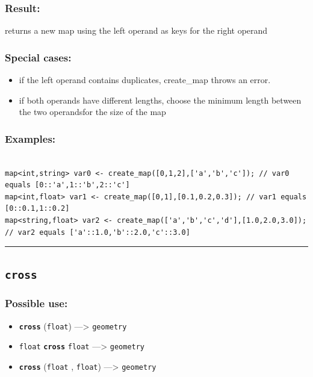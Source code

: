 \documentclass[]{book}
\providecommand{\tightlist}{%
  \setlength{\itemsep}{0pt}\setlength{\parskip}{0pt}}
\theoremstyle{definition}
\theoremstyle{definition}
\theoremstyle{definition}
\theoremstyle{remark}
\begin{document}
\subsubsection{Result:}\label{result-112}

returns a new map using the left operand as keys for the right operand

\subsubsection{Special cases:}\label{special-cases-43}

\begin{itemize}
\tightlist
\item
  if the left operand contains duplicates, create\_map throws an
  error.\\
\item
  if both operands have different lengths, choose the minimum length
  between the two operandsfor the size of the map
\end{itemize}

\subsubsection{Examples:}\label{examples-87}

\begin{verbatim}
 
map<int,string> var0 <- create_map([0,1,2],['a','b','c']); // var0 equals [0::'a',1::'b',2::'c'] 
map<int,float> var1 <- create_map([0,1],[0.1,0.2,0.3]); // var1 equals [0::0.1,1::0.2] 
map<string,float> var2 <- create_map(['a','b','c','d'],[1.0,2.0,3.0]); // var2 equals ['a'::1.0,'b'::2.0,'c'::3.0]
\end{verbatim}

\begin{center}\rule{0.5\linewidth}{\linethickness}\end{center}

\subsection{\texorpdfstring{\texttt{cross}}{cross}}\label{cross}

\subsubsection{Possible use:}\label{possible-use-116}

\begin{itemize}
\tightlist
\item
  \textbf{\texttt{cross}} (\texttt{float}) ---\textgreater{}
  \texttt{geometry}
\item
  \texttt{float} \textbf{\texttt{cross}} \texttt{float}
  ---\textgreater{} \texttt{geometry}
\item
  \textbf{\texttt{cross}} (\texttt{float} , \texttt{float})
  ---\textgreater{} \texttt{geometry}
\end{itemize}
\end{document}
